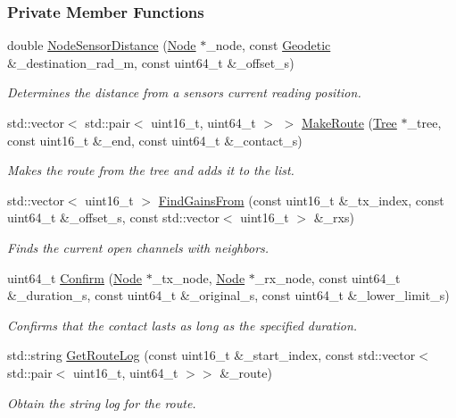 \subsubsection*{Private Member Functions}
\begin{DoxyCompactItemize}
\item 
double \hyperlink{classosse_1_1collaborate_1_1_scheduler_alpha_a3347ebdec27431be3bbd389e1dad88a6}{Node\+Sensor\+Distance} (\hyperlink{classosse_1_1collaborate_1_1_node}{Node} $\ast$\+\_\+node, const \hyperlink{classosse_1_1collaborate_1_1_geodetic}{Geodetic} \&\+\_\+destination\+\_\+rad\+\_\+m, const uint64\+\_\+t \&\+\_\+offset\+\_\+s)
\begin{DoxyCompactList}\small\item\em Determines the distance from a sensor\textquotesingle{}s current reading position. \end{DoxyCompactList}\item 
std\+::vector$<$ std\+::pair$<$ uint16\+\_\+t, uint64\+\_\+t $>$ $>$ \hyperlink{classosse_1_1collaborate_1_1_scheduler_alpha_af858a8d223a945fd93235d0b68a44cee}{Make\+Route} (\hyperlink{classosse_1_1collaborate_1_1_tree}{Tree} $\ast$\+\_\+tree, const uint16\+\_\+t \&\+\_\+end, const uint64\+\_\+t \&\+\_\+contact\+\_\+s)
\begin{DoxyCompactList}\small\item\em Makes the route from the tree and adds it to the list. \end{DoxyCompactList}\item 
std\+::vector$<$ uint16\+\_\+t $>$ \hyperlink{classosse_1_1collaborate_1_1_scheduler_alpha_a6cf7cf015650e1837c6ae65bda26ff95}{Find\+Gains\+From} (const uint16\+\_\+t \&\+\_\+tx\+\_\+index, const uint64\+\_\+t \&\+\_\+offset\+\_\+s, const std\+::vector$<$ uint16\+\_\+t $>$ \&\+\_\+rxs)
\begin{DoxyCompactList}\small\item\em Finds the current open channels with neighbors. \end{DoxyCompactList}\item 
uint64\+\_\+t \hyperlink{classosse_1_1collaborate_1_1_scheduler_alpha_adc69d9527006a9eccc142f9369c93cb5}{Confirm} (\hyperlink{classosse_1_1collaborate_1_1_node}{Node} $\ast$\+\_\+tx\+\_\+node, \hyperlink{classosse_1_1collaborate_1_1_node}{Node} $\ast$\+\_\+rx\+\_\+node, const uint64\+\_\+t \&\+\_\+duration\+\_\+s, const uint64\+\_\+t \&\+\_\+original\+\_\+s, const uint64\+\_\+t \&\+\_\+lower\+\_\+limit\+\_\+s)
\begin{DoxyCompactList}\small\item\em Confirms that the contact lasts as long as the specified duration. \end{DoxyCompactList}\item 
std\+::string \hyperlink{classosse_1_1collaborate_1_1_scheduler_alpha_a66f56e307485a3ab62b625324006d945}{Get\+Route\+Log} (const uint16\+\_\+t \&\+\_\+start\+\_\+index, const std\+::vector$<$ std\+::pair$<$ uint16\+\_\+t, uint64\+\_\+t $>$$>$ \&\+\_\+route)
\begin{DoxyCompactList}\small\item\em Obtain the string log for the route. \end{DoxyCompactList}\end{DoxyCompactItemize}
